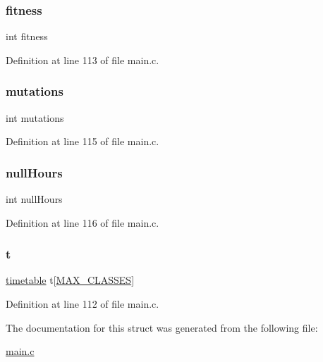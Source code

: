\hypertarget{structindividual_ab2cb5ef123761236be21ad8440cb6e6b}{}\label{structindividual_ab2cb5ef123761236be21ad8440cb6e6b} 
\subsubsection{\texorpdfstring{fitness}{fitness}}
{\footnotesize\ttfamily int fitness}



Definition at line 113 of file main.\+c.

\hypertarget{structindividual_a935150bbe2179cbd3ea7428dd8d459c1}{}\label{structindividual_a935150bbe2179cbd3ea7428dd8d459c1} 
\subsubsection{\texorpdfstring{mutations}{mutations}}
{\footnotesize\ttfamily int mutations}



Definition at line 115 of file main.\+c.

\hypertarget{structindividual_ac45c43cafaa02d7cab79893188a9164d}{}\label{structindividual_ac45c43cafaa02d7cab79893188a9164d} 
\subsubsection{\texorpdfstring{null\+Hours}{nullHours}}
{\footnotesize\ttfamily int null\+Hours}



Definition at line 116 of file main.\+c.

\hypertarget{structindividual_a80bde47459d4d03a7f1ed0c6fb5e2ffb}{}\label{structindividual_a80bde47459d4d03a7f1ed0c6fb5e2ffb} 
\subsubsection{\texorpdfstring{t}{t}}
{\footnotesize\ttfamily \hyperlink{structtimetable}{timetable} t\mbox{[}\hyperlink{main_8c_aa322a61b17e1d56852d53d5ef6a728c6}{M\+A\+X\+\_\+\+C\+L\+A\+S\+S\+ES}\mbox{]}}



Definition at line 112 of file main.\+c.



The documentation for this struct was generated from the following file\+:\begin{DoxyCompactItemize}
\item 
\hyperlink{main_8c}{main.\+c}\end{DoxyCompactItemize}
